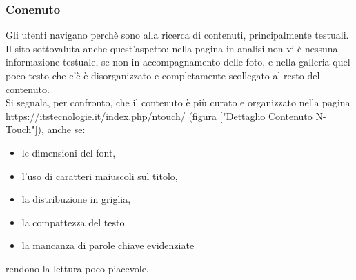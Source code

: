 \subsubsection{Conenuto}
Gli utenti navigano perchè sono alla ricerca di contenuti, principalmente testuali. Il sito sottovaluta anche quest'aspetto: nella pagina in analisi non vi è nessuna informazione testuale, se non in accompagnamento delle foto, e nella galleria quel poco testo che c'è è disorganizzato e completamente scollegato al resto del contenuto. \\ Si segnala, per confronto, che il contenuto è più curato e organizzato nella pagina \url{https://itstecnologie.it/index.php/ntouch/} (figura \ref{"Dettaglio Contenuto N-Touch"}), anche se: \begin{itemize}
\item le dimensioni del font, \item l'uso di caratteri maiuscoli sul titolo, \item la distribuzione in griglia, \item la compattezza del testo \item la mancanza di parole chiave evidenziate \end{itemize} rendono la lettura poco piacevole.

